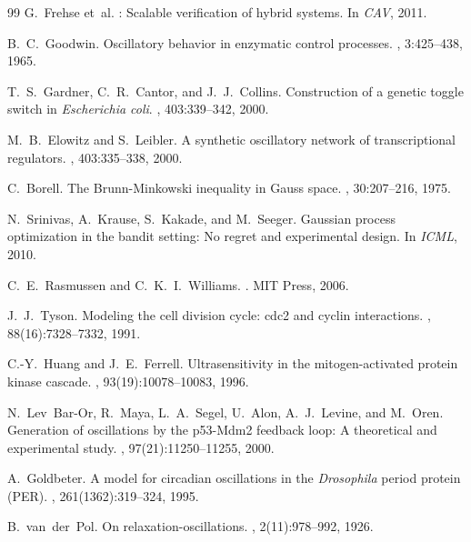 \documentclass[11pt]{article}
\begin{document}
\begin{thebibliography}{99}
G.~Frehse et~al.
: Scalable verification of hybrid systems.
\newblock In {\em CAV}, 2011.

B.~C.~Goodwin.
\newblock Oscillatory behavior in enzymatic control processes.
, 3:425--438, 1965.

T.~S.~Gardner, C.~R.~Cantor, and J.~J.~Collins.
\newblock Construction of a genetic toggle switch in \emph{Escherichia coli}.
, 403:339--342, 2000.

M.~B.~Elowitz and S.~Leibler.
\newblock A synthetic oscillatory network of transcriptional regulators.
, 403:335--338, 2000.

C.~Borell.
\newblock The {B}runn-{M}inkowski inequality in {G}auss space.
, 30:207--216, 1975.

N.~Srinivas, A.~Krause, S.~Kakade, and M.~Seeger.
\newblock Gaussian process optimization in the bandit setting: No regret and experimental design.
\newblock In {\em ICML}, 2010.

C.~E.~Rasmussen and C.~K.~I.~Williams.
.
\newblock MIT Press, 2006.

J.~J.~Tyson.
\newblock Modeling the cell division cycle: cdc2 and cyclin interactions.
, 88(16):7328--7332, 1991.

C.-Y.~Huang and J.~E.~Ferrell.
\newblock Ultrasensitivity in the mitogen-activated protein kinase cascade.
, 93(19):10078--10083, 1996.

N.~Lev~Bar-Or, R.~Maya, L.~A.~Segel, U.~Alon, A.~J.~Levine, and M.~Oren.
\newblock Generation of oscillations by the p53-{M}dm2 feedback loop: A theoretical and experimental study.
, 97(21):11250--11255, 2000.

A.~Goldbeter.
\newblock A model for circadian oscillations in the \emph{Drosophila} period protein ({PER}).
, 261(1362):319--324, 1995.

B.~van~der~Pol.
\newblock On relaxation-oscillations.
, 2(11):978--992, 1926.

\end{thebibliography}
\end{document}
